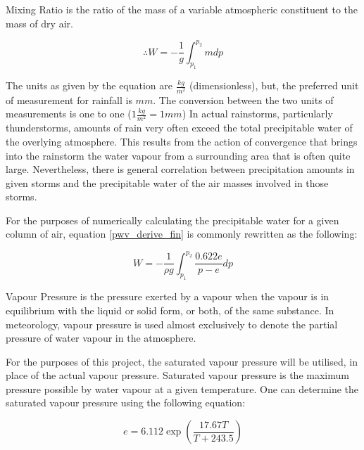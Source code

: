 \begin{definition}
Mixing Ratio is the ratio of the mass of a variable atmospheric constituent to the mass of dry air.
\end{definition}

\begin{equation}
    \label{pwv_derive_fin}
    \therefore W = -\frac{1}{g} \int_{p_1}^{p_2} m dp
\end{equation}

The units as given by the equation are $\frac{kg}{m^2}$ (dimensionless), but, the preferred unit of measurement for rainfall is $mm$. The conversion between the two units of measurements is one to one ($1 \frac{kg}{m^2} = 1 mm$) In actual rainstorms, particularly thunderstorms, amounts of rain very often exceed the total precipitable water of the overlying atmosphere. This results from the action of convergence that brings into the rainstorm the water vapour from a surrounding area that is often quite large. Nevertheless, there is general correlation between precipitation amounts in given storms and the precipitable water of the air masses involved in those storms\cite{problems_with_pwv}.

For the purposes of numerically calculating the precipitable water for a given column of air, equation \ref{pwv_derive_fin} is commonly rewritten as the following:

\begin{equation}
    \label{pwv}
    W = -\frac{1}{\rho g} \int_{p_1}^{p_2} \frac{0.622 e}{p - e} dp
\end{equation}

\begin{definition}
Vapour Pressure is the pressure exerted by a vapour when the vapour is in equilibrium with the liquid or solid form, or both, of the same substance. In meteorology, vapour pressure is used almost exclusively to denote the partial pressure of water vapour in the atmosphere.
\end{definition}

For the purposes of this project, the saturated vapour pressure will be utilised, in place of the actual vapour pressure. Saturated vapour pressure is the maximum pressure possible by water vapour at a given temperature. One can determine the saturated vapour pressure using the following equation\cite{balton}:

\begin{equation}
    e = 6.112 \exp(\frac{17.67 T}{T + 243.5})
\end{equation}

